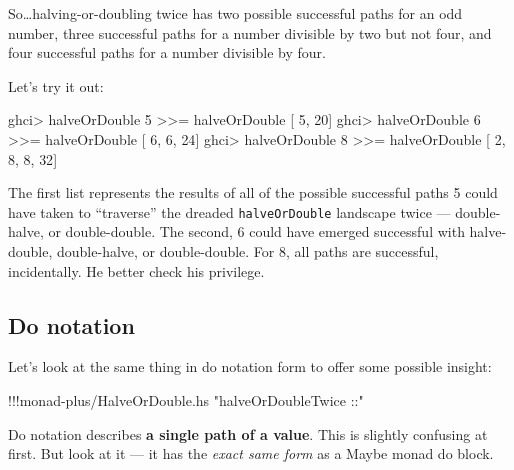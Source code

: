 \documentclass[]{article}
\newenvironment{Shaded}{}{}
\newcommand{\DecValTok}[1]{\textcolor[rgb]{0.25,0.63,0.44}{{#1}}}
\newcommand{\StringTok}[1]{\textcolor[rgb]{0.25,0.44,0.63}{{#1}}}
\newcommand{\FunctionTok}[1]{\textcolor[rgb]{0.02,0.16,0.49}{{#1}}}
\newcommand{\NormalTok}[1]{{#1}}
\begin{document}
So\ldots{}halving-or-doubling twice has two possible successful paths
for an odd number, three successful paths for a number divisible by two
but not four, and four successful paths for a number divisible by four.

Let's try it out:

\begin{Shaded}
\begin{Highlighting}[]
\NormalTok{ghci}\FunctionTok{>} \NormalTok{halveOrDouble }\DecValTok{5} \FunctionTok{>>=} \NormalTok{halveOrDouble}
\NormalTok{[       }\DecValTok{5}\NormalTok{, }\DecValTok{20}\NormalTok{]}
\NormalTok{ghci}\FunctionTok{>} \NormalTok{halveOrDouble }\DecValTok{6} \FunctionTok{>>=} \NormalTok{halveOrDouble}
\NormalTok{[    }\DecValTok{6}\NormalTok{, }\DecValTok{6}\NormalTok{, }\DecValTok{24}\NormalTok{]}
\NormalTok{ghci}\FunctionTok{>} \NormalTok{halveOrDouble }\DecValTok{8} \FunctionTok{>>=} \NormalTok{halveOrDouble}
\NormalTok{[ }\DecValTok{2}\NormalTok{, }\DecValTok{8}\NormalTok{, }\DecValTok{8}\NormalTok{, }\DecValTok{32}\NormalTok{]}
\end{Highlighting}
\end{Shaded}

The first list represents the results of all of the possible successful
paths 5 could have taken to ``traverse'' the dreaded
\texttt{halveOrDouble} landscape twice --- double-halve, or
double-double. The second, 6 could have emerged successful with
halve-double, double-halve, or double-double. For 8, all paths are
successful, incidentally. He better check his privilege.

\subsection{Do notation}\label{do-notation}

Let's look at the same thing in do notation form to offer some possible
insight:

\begin{Shaded}
\begin{Highlighting}[]
\FunctionTok{!!!}\NormalTok{monad}\FunctionTok{-}\NormalTok{plus}\FunctionTok{/}\NormalTok{HalveOrDouble.hs }\StringTok{"halveOrDoubleTwice ::"}
\end{Highlighting}
\end{Shaded}

Do notation describes \textbf{a single path of a value}. This is
slightly confusing at first. But look at it --- it has the \emph{exact
same form} as a Maybe monad do block.
\end{document}
